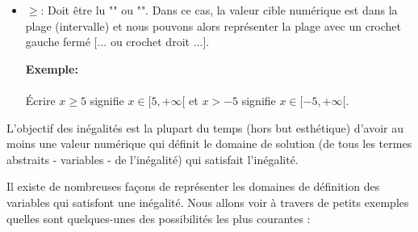 \begin{itemize}
		\item $\geq$: Doit être lu "" ou "". Dans ce cas, la valeur cible numérique est dans la plage (intervalle) et nous pouvons alors représenter la plage avec un crochet gauche fermé $[...$ ou crochet droit $...]$.
		
		\begin{tcolorbox}[colframe=black,colback=white,sharp corners]
	\textbf{{\Large {}}Exemple:}\\\\
		Écrire $x\geq 5$ signifie $x \in [5,+\infty[$ et $x>-5$ signifie $x \in [-5,+\infty[$.
		\end{tcolorbox}
	
	\end{itemize}
	L'objectif des inégalités est la plupart du temps (hors but esthétique) d'avoir au moins une valeur numérique qui définit le domaine de solution (de tous les termes abstraits - variables - de l'inégalité) qui satisfait l'inégalité.
	
	Il existe de nombreuses façons de représenter les domaines de définition des variables qui satisfont une inégalité. Nous allons voir à travers de petits exemples quelles sont quelques-unes des possibilités les plus courantes :
	
